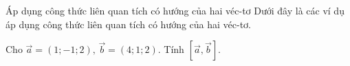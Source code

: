 \begin{dang}{Áp dụng công thức liên quan tích có hướng của hai véc-tơ}
	Dưới đây là các ví dụ áp dụng công thức liên quan tích có hướng của hai véc-tơ.
\end{dang}
\begin{vd}
	Cho $\overrightarrow{a}=(1;-1;2),\,\overrightarrow{b}=(4;1;2)$. Tính $\left[\overrightarrow{a},\overrightarrow{b}\right]$.
\end{vd}
